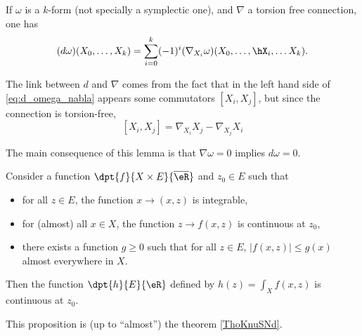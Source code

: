\begin{lemma}
If $\omega$ is a $k$-form (not specially a symplectic one), and $\nabla$ a torsion free connection, one has
\begin{equation}\label{eq:d_omega_nabla}
  (d\omega)(X_0,\ldots,X_k)=\sum_{i=0}^k (-1)^i(\nabla_{X_i}\omega)(X_0,\ldots,\hX_i,\ldots X_k).
\end{equation}
\end{lemma}

\begin{remark}
The link between $d$ and $\nabla$ comes from the fact that in the left hand side of \eqref{eq:d_omega_nabla} appears some commutators $[X_i,X_j]$, but since the connection is torsion-free,
\[
  [X_i,X_j]=\nabla_{X_i}X_j-\nabla_{X_j}X_i
\]
\end{remark}
The main consequence of this lemma is that $\nabla\omega=0$ implies $d\omega=0$. 

\begin{proposition} \label{prop:fdefint}
    Consider a function $\dpt{f}{X\times E}{\overline{\eR}}$ and $z_0\in E$ such that
    \begin{itemize}
        \item for all $z\in E$, the function $x\to(x,z)$ is integrable,
        \item for (almost) all $x\in X$, the function $z\to f(x,z)$ is continuous at $z_0$,
        \item there exists a function $g\geq 0$ such that for all $z\in E$, $| f(x,z) |\leq g(x)$ almost everywhere in $X$.
    \end{itemize}
    Then the function $\dpt{h}{E}{\eR}$ defined by $h(z)=\int_Xf(x,z)$ is continuous at $z_0$.
\end{proposition}
This proposition is (up to ``almost'') the theorem \ref{ThoKnuSNd}.


